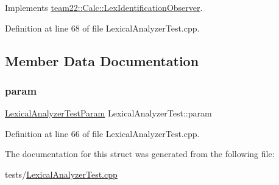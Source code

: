 Implements \hyperlink{classteam22_1_1_calc_1_1_lex_identification_observer_ac139f75c560625ec6fdb2e34cf0d4884}{team22\+::\+Calc\+::\+Lex\+Identification\+Observer}.



Definition at line 68 of file Lexical\+Analyzer\+Test.\+cpp.



\subsection{Member Data Documentation}
\mbox{\label{struct_lexical_analyzer_test_ad6d61cc18154fb0f6b92eb10d840dc35}} 
\subsubsection{\texorpdfstring{param}{param}}
{\footnotesize\ttfamily \hyperlink{struct_lexical_analyzer_test_param}{Lexical\+Analyzer\+Test\+Param} Lexical\+Analyzer\+Test\+::param}



Definition at line 66 of file Lexical\+Analyzer\+Test.\+cpp.



The documentation for this struct was generated from the following file\+:\begin{DoxyCompactItemize}
\item 
tests/\hyperlink{_lexical_analyzer_test_8cpp}{Lexical\+Analyzer\+Test.\+cpp}\end{DoxyCompactItemize}
